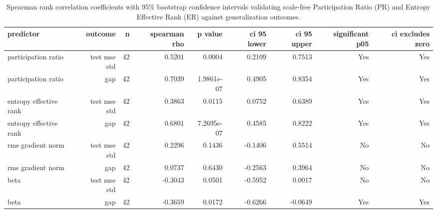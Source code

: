 \begin{table}[htbp]
\centering
\caption{Spearman rank correlation coefficients with 95\% bootstrap confidence intervals validating scale-free Participation Ratio (PR) and Entropy Effective Rank (ER) against generalization outcomes.}
\label{tab:rank_correlations}
\begin{tabular}{lrrrrrrrr}
\toprule
\textbf{predictor} & \textbf{outcome} & \textbf{n} & \textbf{spearman rho} & \textbf{p value} & \textbf{ci 95 lower} & \textbf{ci 95 upper} & \textbf{significant p05} & \textbf{ci excludes zero} \\
\midrule
participation ratio & test mse std & 42 & 0.5201 & 0.0004 & 0.2109 & 0.7513 & Yes & Yes \\
participation ratio & gap & 42 & 0.7039 & 1.9861e-07 & 0.4905 & 0.8354 & Yes & Yes \\
entropy effective rank & test mse std & 42 & 0.3863 & 0.0115 & 0.0752 & 0.6389 & Yes & Yes \\
entropy effective rank & gap & 42 & 0.6801 & 7.2695e-07 & 0.4585 & 0.8222 & Yes & Yes \\
rms gradient norm & test mse std & 42 & 0.2296 & 0.1436 & -0.1406 & 0.5514 & No & No \\
rms gradient norm & gap & 42 & 0.0737 & 0.6430 & -0.2563 & 0.3964 & No & No \\
beta & test mse std & 42 & -0.3043 & 0.0501 & -0.5952 & 0.0017 & No & No \\
beta & gap & 42 & -0.3659 & 0.0172 & -0.6266 & -0.0649 & Yes & Yes \\
\bottomrule
\end{tabular}
\end{table}